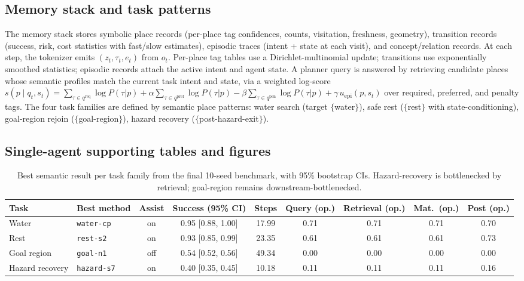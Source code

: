 \documentclass{article}
\newcommand{\method}[1]{\texttt{#1}}
\begin{document}
\subsection{Memory stack and task patterns}

The memory stack stores symbolic place records (per-place tag confidences, counts, visitation, freshness, geometry), transition records (success, risk, cost statistics with fast/slow estimates), episodic traces (intent + state at each visit), and concept/relation records. At each step, the tokenizer emits $(z_t, \tau_t, e_t)$ from $o_t$. Per-place tag tables use a Dirichlet-multinomial update; transitions use exponentially smoothed statistics; episodic records attach the active intent and agent state. A planner query is answered by retrieving candidate places whose semantic profiles match the current task intent and state, via a weighted log-score
$s(p \mid q_t, s_t) = \sum_{\tau \in q^{\mathrm{req}}} \log P(\tau|p)
+ \alpha \sum_{\tau \in q^{\mathrm{pref}}} \log P(\tau|p)
- \beta \sum_{\tau \in q^{\mathrm{pen}}} \log P(\tau|p)
+ \gamma\, u_{\mathrm{epi}}(p, s_t)$
over required, preferred, and penalty tags. The four task families are defined by semantic place patterns: water search (target $\{$water$\}$), safe rest ($\{$rest$\}$ with state-conditioning), goal-region rejoin ($\{$goal-region$\}$), hazard recovery ($\{$post-hazard-exit$\}$).

\subsection{Single-agent supporting tables and figures}
\label{p1:app:single-results-table}

\begin{table}[!ht]
  \caption{Best semantic result per task family from the final 10-seed benchmark, with 95\% bootstrap CIs. Hazard-recovery is bottlenecked by retrieval; goal-region remains downstream-bottlenecked.}
  \label{p1:tab:main-results}
  \centering
  \scriptsize
  \setlength{\tabcolsep}{3.5pt}
  \begin{tabular}{p{1.5cm}p{1.7cm}c c c c c c c}
    \toprule
    Task & Best method & Assist & Success (95\% CI) & Steps & Query (op.) & Retrieval (op.) & Mat.\ (op.) & Post (op.) \\
    \midrule
    Water & \method{water-cp} & on & 0.95 [0.88, 1.00] & 17.99 & 0.71 & 0.71 & 0.71 & 0.70 \\
    Rest & \method{rest-s2} & on & 0.93 [0.85, 0.99] & 23.35 & 0.61 & 0.61 & 0.61 & 0.73 \\
    Goal region & \method{goal-n1} & off & 0.54 [0.52, 0.56] & 49.34 & 0.00 & 0.00 & 0.00 & 0.00 \\
    Hazard recovery & \method{hazard-s7} & on & 0.40 [0.35, 0.45] & 10.18 & 0.11 & 0.11 & 0.11 & 0.16 \\
    \bottomrule
  \end{tabular}
\end{table}
\end{document}

